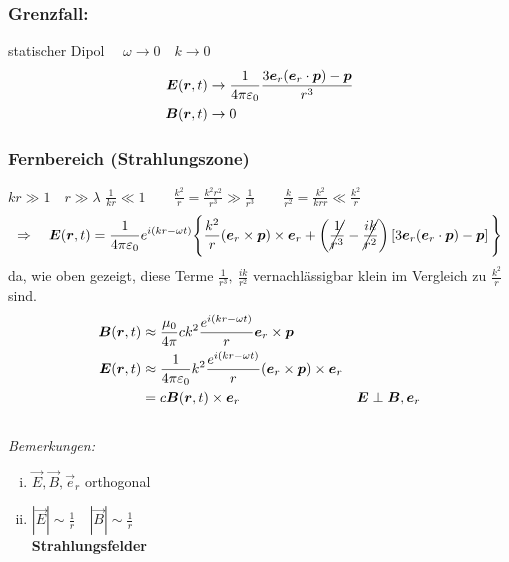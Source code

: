 \subsubsection{Grenzfall:}

statischer Dipol $ \quad \omega \to 0 \quad k \to 0 $
\begin{align*}
\bm{E}(\bm{r},t) &\rightarrow \frac{1}{4\pi\varepsilon_0} \frac{3 \bm{e}_r (\bm{e}_r \cdot \bm{p}) - \bm{p}}{r^3}\\
\bm{B}(\bm{r},t) &\rightarrow 0
\end{align*}
\subsubsection{Fernbereich (Strahlungszone)}
$ kr \gg 1 \quad r \gg \lambda $
%
%
%
%
%
%
$ \frac{1}{kr} \ll 1 \qquad \frac{k^2}{r} = \frac{k^2 r^2}{r^3} \gg \frac{1}{r^3} \qquad \frac{k}{r^2} = \frac{k^2}{kr r} \ll \frac{k^2}{r} $
\begin{equation*}
\Rightarrow \quad \bm{E}(\bm{r},t) = \frac{1}{4\pi\varepsilon_0} e^{i (kr - \omega t)} \Bigg\{ \frac{k^2}{r} (\bm{e}_r \times \bm{p}) \times \bm{e}_r + \left(\cancel{\frac{1}{r^3}} - \cancel{\frac{ik}{r^2}}\right) \left[3 \bm{e}_r (\bm{e}_r \cdot \bm{p}) - \bm{p}\right]\Bigg\}
\end{equation*}
da, wie oben gezeigt, diese Terme $ \frac{1}{r^3}, \ \frac{ik}{r^2} $ vernachlässigbar klein im Vergleich zu $ \frac{k^2}{r} $ sind.
\begin{align*}
\bm{B}(\bm{r},t) &\approx \frac{\mu_0}{4 \pi} c k^2 \frac{e^{i (kr - \omega t)}}{r} \bm{e}_r \times \bm{p} \\
\bm{E}(\bm{r},t) &\approx \frac{1}{4\pi\varepsilon_0} k^2 \frac{e^{i(kr - \omega t)}}{r} (\bm{e}_r \times \bm{p}) \times \bm{e}_r\\
&= c \bm{B}(\bm{r},t) \times \bm{e}_r \qquad \qquad &\bm{E} \perp \bm{B}, \bm{e}_r
\end{align*}
%
%
%
%
%
%
\\[10pt]
\emph{Bemerkungen:}
\begin{enumerate}[i)]
	\item $ \vec{E},\vec{B},\vec{e}_r $ orthogonal
	\item $ |\vec{E}| \sim \frac{1}{r} \quad |\vec{B}| \sim \frac{1}{r} $\\
	\textbf{Strahlungsfelder}\\
\end{enumerate}

